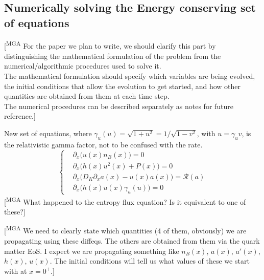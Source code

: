 \documentclass[11pt]{article}
\newcommand{\mgacom}[1]{\textsf{\color[rgb]{0.75,0,0}[\textsuperscript{MGA} #1]}}
\begin{document}
\clearpage

\subsection{Numerically solving the Energy conserving set of equations}\label{sec:numerical_solver_implementation_details}

\mgacom{For the paper we plan to write, we should clarify this part by distinguishing the mathematical formulation of the problem from the numerical/algorithmic procedures used to solve it.\\
The mathematical formulation should specify which variables are being evolved, the initial conditions that allow the evolution to get started, and how other quantities are obtained from them at each time step.\\
The numerical procedures can be described separately as notes for future reference.}

New set of equations, where $\gamma_u(u) = \sqrt{1+u^2} = 1/\sqrt{1-v^2}$, with $u = \gamma_u v$, is the relativistic gamma factor, not to be confused with the rate. 
\begin{equation}
\left\{
\begin{aligned}
& \partial_x\Big(u(x) n_B(x)\Big) = 0 \\
& \partial_x\Big( h(x)u^2(x) + P(x)\Big) = 0\\
& \partial_x\Big( D_K\partial_x a(x) - u(x)a(x)\Big) = \mathcal{R}(a)\\
& \partial_x\Big( h(x)u(x)\gamma_u(u)\Big) = 0
\end{aligned}
\right. 
\end{equation}
\mgacom{What happened to the entropy flux equation? Is it equivalent to one of these?}

\smallskip\noindent
\mgacom{We need to clearly state which quantities (4 of them, obviously) we are propagating using these diffeqs. The others are obtained from them via the quark matter EoS. I expect we are propagating something like $n_B(x)$, $a(x)$, $a'(x)$, $h(x)$, $u(x)$.  The initial conditions will tell us what values of these we start with at $x=0^+$.}
\end{document}
